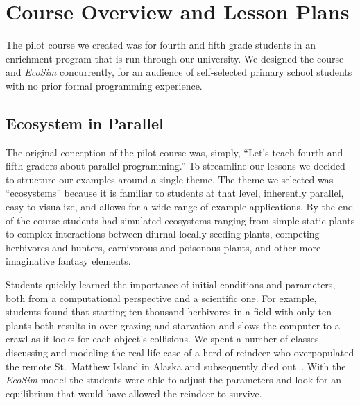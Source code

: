 \documentclass{sig-alternate}
\begin{document}
\section{Course Overview and Lesson Plans}
The pilot course we created was for fourth and fifth grade students in an enrichment program
that is run through our university.  We designed the course and \emph{EcoSim} concurrently,
for an audience of self-selected primary school students with no
prior formal programming experience.

\subsection{Ecosystem in Parallel}
The original conception of the pilot course was, simply, 
``Let's teach fourth and fifth graders about parallel programming.''
To streamline our lessons we decided to structure our examples around a single theme.
The theme we selected was ``ecosystems'' because
it is familiar to students at that level,
inherently parallel, 
easy to visualize, 
and allows for a wide range of example applications.
By the end of the course students had simulated ecosystems
ranging from simple static plants to complex interactions between 
diurnal locally-seeding plants, competing herbivores and hunters, 
carnivorous and poisonous plants, and other more imaginative fantasy elements.

Students quickly learned the importance of initial conditions and parameters, both from a 
computational perspective and a scientific one.  
For example, students found that starting 
ten thousand herbivores in a field with only ten plants
both results in over-grazing and starvation 
and slows the computer to a crawl as it looks for each object's collisions.
We spent a number of classes discussing and
modeling the real-life case of a herd of reindeer who overpopulated the remote
St.~Matthew Island in Alaska and subsequently died out~\cite{klein1968introduction,stMatthewIsland}.
With the \emph{EcoSim} model the students were able to adjust the parameters 
and look for an equilibrium that would have allowed the reindeer to survive.
\end{document}
